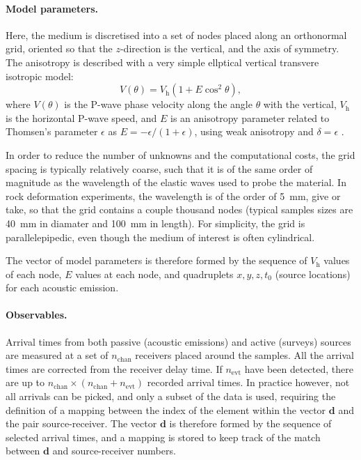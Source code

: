 \documentclass{article}
\renewcommand\vec[1]{\mathbf{#1}}
\begin{document}
\paragraph{Model parameters.} Here, the medium is discretised into a set of nodes placed along an orthonormal grid, oriented so that the $z$-direction is the vertical, and the axis of symmetry. The anisotropy is described with a very simple ellptical vertical transvere isotropic model:
\begin{equation}
  V(\theta) = V_\mathrm{h}(1+E\cos^2\theta),
\end{equation}
where $V(\theta)$ is the P-wave phase velocity along the angle $\theta$ with the vertical, $V_\mathrm{h}$ is the horizontal P-wave speed, and $E$ is an anisotropy parameter related to Thomsen's parameter $\epsilon$ as $E = -\epsilon/(1+\epsilon)$, using weak anisotropy and $\delta=\epsilon$ \citep{thomsen86}.

In order to reduce the number of unknowns and the computational costs, the grid spacing is typically relatively coarse, such that it is of the same order of magnitude as the wavelength of the elastic waves used to probe the material. In rock deformation experiments, the wavelength is of the order of 5~mm, give or take, so that the grid contains a couple thousand nodes (typical samples sizes are 40~mm in diamater and 100~mm in length). For simplicity, the grid is parallelepipedic, even though the medium of interest is often cylindrical.

The vector of model parameters is therefore formed by the sequence of $V_\mathrm{h}$ values of each node, $E$ values at each node, and quadruplets $x,y,z,t_0$ (source locations) for each acoustic emission.

\paragraph{Observables.} Arrival times from both passive (acoustic emissions) and active (surveys) sources are measured at a set of $n_\mathrm{chan}$ receivers placed around the samples. All the arrival times are corrected from the receiver delay time. If $n_\mathrm{evt}$ have been detected, there are up to $n_\mathrm{chan}\times(n_\mathrm{chan} + n_\mathrm{evt})$ recorded arrival times. In practice however, not all arrivals can be picked, and only a subset of the data is used, requiring the definition of a mapping between the index of the element within the vector $\vec{d}$ and the pair source-receiver. The vector $\vec{d}$ is therefore formed by the sequence of selected arrival times, and a mapping is stored to keep track of the match between $\vec{d}$ and source-receiver numbers.
\end{document}
